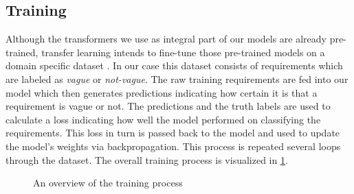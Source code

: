 \subsection{Training}
\label{chp:study:sec:design:subsec:training}
Although the transformers we use as integral part of our models are already pre-trained, transfer learning intends to fine-tune those pre-trained models on a domain specific dataset \parencite{Pan:2010}.
In our case this dataset consists of requirements which are labeled as \textit{vague} or \textit{not-vague}.
The raw training requirements are fed into our model which then generates predictions indicating how certain it is that a requirement is vague or not.
The predictions and the truth labels are used to calculate a loss indicating how well the model performed on classifying the requirements.
This loss in turn is passed back to the model and used to update the model's weights via backpropagation.
This process is repeated several loops through the dataset.
The overall training process is visualized in \cref{fig:study:design:training}.

\begin{figure}[htpb]
    \centering
    \def\svgwidth{\columnwidth}
    
    \caption[Study Design: Training]{An overview of the training process}\label{fig:study:design:training}
\end{figure}
